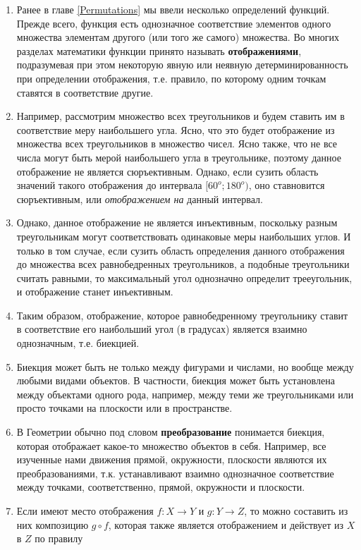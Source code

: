 
\begin{enumerate}
\item Ранее в главе \ref{Permutations} мы ввели несколько определений функций. Прежде всего, функция есть однозначное соответствие элементов одного множества элементам другого (или того же самого) множества. Во многих разделах математики функции принято называть \textbf{отображениями}, подразумевая при этом некоторую явную или неявную детерминированность при определении отображения, т.е. правило, по которому одним точкам ставятся в соответствие другие.
\item Например, рассмотрим множество всех треугольников и будем ставить им в соответствие меру наибольшего угла. Ясно, что это будет отображение из множества всех треугольников в множество чисел. Ясно также, что не все числа могут быть мерой наибольшего угла в треугольнике, поэтому данное отображение не является сюръективным. Однако, если сузить область значений такого отображения до интервала $[60^o;180^o)$, оно ставновится сюръективным, или \textit{отображением на} данный интервал.
\item Однако, данное отображение не является инъективным, поскольку разным треугольникам могут соответствовать одинаковые меры наибольших углов. И только в том случае, если сузить область определения данного отображения до множества всех равнобедренных треугольников, а подобные треугольники считать равными, то максимальный угол однозначно определит трееугольник, и отображение станет инъективным.
\item Таким образом, отображение, которое равнобедренному треугольнику ставит в соответствие его наибольший угол (в градусах) является взаимно однозначным, т.е. биекцией.
\item Биекция может быть не только между фигурами и числами, но вообще между любыми видами объектов. В частности, биекция может быть установлена между объектами одного рода, например, между теми же треугольниками или просто точками на плоскости или в пространстве.
\item В Геометрии обычно под словом \textbf{преобразование} понимается биекция, которая отображает какое-то множество объектов в себя. Например, все изученные нами движения прямой, окружности, плоскости являются их преобразованиями, т.к. устанавливают взаимно однозначное соответствие между точками, соответственно, прямой, окружности и плоскости.
\item Если имеют место отображения $f:X\to Y$ и $g:Y\to Z$, то можно составить из них композицию $g\circ f$, которая также является отображением и действует из $X$ в $Z$ по правилу

\end{enumerate}
